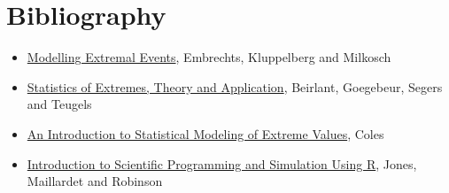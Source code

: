 \appendix
\chapter*{Bibliography}
\begin{itemize}
	\item \underline{Modelling Extremal Events}, Embrechts, Kluppelberg and Milkosch
	\item \underline{Statistics of Extremes, Theory and Application}, Beirlant, Goegebeur, Segers and Teugels
	\item \underline{An Introduction to Statistical Modeling of Extreme Values}, Coles
	\item \underline{Introduction to Scientific Programming and Simulation Using R}, Jones, Maillardet and Robinson
\end{itemize}

